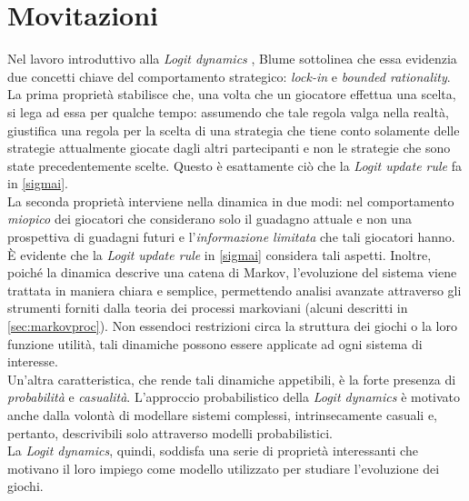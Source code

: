 \section{Movitazioni}\label{sec:motiv}
Nel lavoro introduttivo alla \textit{Logit dynamics} \cite{blume1993statistical}, Blume sottolinea che essa evidenzia due concetti chiave del comportamento strategico: \textit{lock-in} e \textit{bounded rationality}.\\
La prima proprietà stabilisce che, una volta che un giocatore effettua una scelta, si lega ad essa per qualche tempo: assumendo che tale regola valga nella realtà, giustifica una regola per la scelta di una strategia che tiene conto solamente delle strategie attualmente giocate dagli altri partecipanti e non le strategie che sono state precedentemente scelte. Questo è esattamente ciò che la \textit{Logit update rule} fa in \ref{sigmai}.\\
La seconda proprietà interviene nella dinamica in due modi: nel comportamento \textit{miopico} dei giocatori che considerano solo il guadagno attuale e non una prospettiva di guadagni futuri e l'\textit{informazione limitata} che tali giocatori hanno. È evidente che la \textit{Logit update rule} in \ref{sigmai} considera tali aspetti. Inoltre, poiché la dinamica descrive una catena di Markov, l'evoluzione del sistema viene trattata in maniera chiara e semplice, permettendo analisi avanzate attraverso gli strumenti forniti dalla teoria dei processi markoviani (alcuni descritti in \ref{sec:markovproc}). Non essendoci restrizioni circa la struttura dei giochi o la loro funzione utilità, tali dinamiche possono essere applicate ad ogni sistema di interesse.\\
Un'altra caratteristica, che rende tali dinamiche appetibili, è la forte presenza di \textit{probabilità} e \textit{casualità}. L'approccio probabilistico della \textit{Logit dynamics} è motivato anche dalla volontà di modellare sistemi complessi, intrinsecamente casuali e, pertanto, descrivibili solo attraverso modelli probabilistici.\\
La \textit{Logit dynamics}, quindi, soddisfa una serie di proprietà interessanti che motivano il loro impiego come modello utilizzato per studiare l'evoluzione dei giochi.
